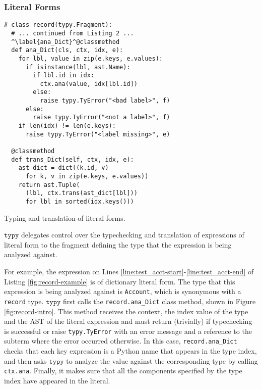 \documentclass[preprint,10pt]{sigplanconf}
\newcommand{\typy}{\texttt{typy}}
\newcommand{\lip}[1]{\lstinline[language=Python,basicstyle=\ttfamily\footnotesize,deletendkeywords={tuple,buffer,map}]{#1}}
\newcommand{\li}[1]{\lip{#1}}
\begin{document}
\subsubsection{Literal Forms}\label{sec:literals}
\vspace{-3px}
\begin{codelisting}[t]
\vspace{-3px}
\begin{lstlisting}
# class record(typy.Fragment): 
  # ... continued from Listing 2 ...
  ^\label{ana_Dict}^@classmethod
  def ana_Dict(cls, ctx, idx, e):
    for lbl, value in zip(e.keys, e.values):
      if isinstance(lbl, ast.Name):
        if lbl.id in idx: 
          ctx.ana(value, idx[lbl.id])
        else: 
          raise typy.TyError("<bad label>", f)
      else: 
        raise typy.TyError("<not a label>", f)
    if len(idx) != len(e.keys): 
      raise typy.TyError("<label missing>", e)

  @classmethod
  def trans_Dict(self, ctx, idx, e): 
    ast_dict = dict((k.id, v) 
      for k, v in zip(e.keys, e.values))
    return ast.Tuple(
      (lbl, ctx.trans(ast_dict[lbl]))
      for lbl in sorted(idx.keys()))
\end{lstlisting}
\caption{Typing and translation of literal forms.}
\label{fig:record-intro}
\end{codelisting}
$\typy$ delegates control over the typechecking and translation of expressions of literal form to the fragment defining the type that the expression is being analyzed against. 

For example, the expression on Lines \ref{line:test_acct-start}-\ref{line:test_acct-end} of Listing \ref{fig:record-example} is of dictionary literal form. The type that this expression is being analyzed against is \li{Account}, which is synonymous with a \li{record} type. $\typy$ first calls the \li{record.ana_Dict} class method, shown in Figure \ref{fig:record-intro}. This method receives the context, the index value of the type and the AST of the literal expression and must return (trivially) if typechecking is successful or raise \li{typy.TyError} with an error message and a reference to the subterm where the error occurred otherwise. In this case, \li{record.ana_Dict} checks that each key expression is a Python name that appears in the type index, and then asks $\typy$ to analyze the value against the corresponding type by calling \li{ctx.ana}. Finally, it makes sure that all the components specified by the type index have appeared in the literal.
\end{document}

